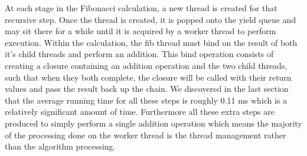 \documentclass[12pt,twoside,notitlepage]{report}
\begin{document}
%
At each stage in the Fibonacci calculation, a new thread is created for that recursive step. Once the thread is created, it is popped onto the yield queue and may sit there for a while until it is acquired by a worker thread to
perform execution. Within the calculation, the fib thread must bind on the result of both it's child threads and perform an addition. This bind operation consists of creating a closure containing an addition operation and the two
child threads, such that when they both complete, the closure will be called with their return values and pass the result back up the chain. We discovered in the last section that the average running time for all these steps is
roughly 0.11 ms which is a relatively significant amount of time. Furthermore all these extra steps are produced to simply perform a single addition operation which means the majority of the processing done on the worker thread is the
thread management rather than the algorithm processing.
% 
\end{document}
